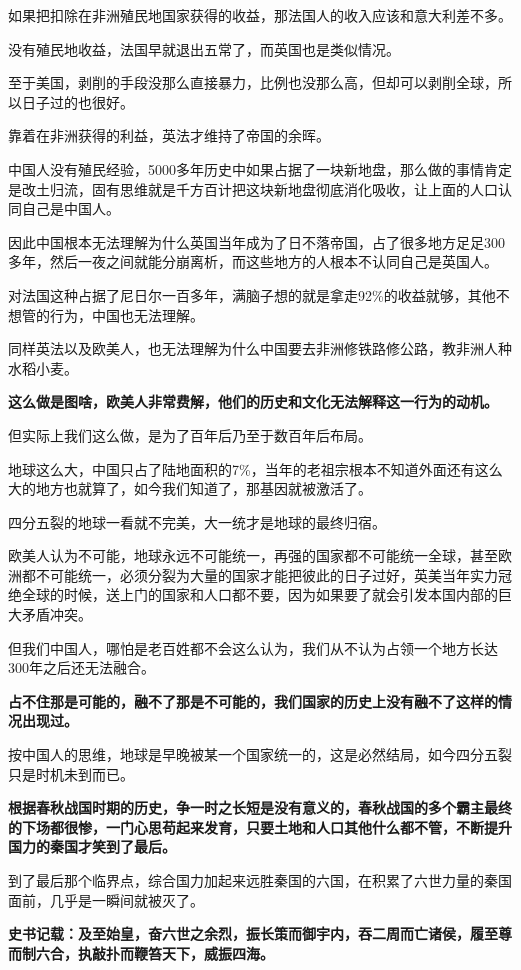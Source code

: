 \documentclass[UTF8, 11pt, oneside]{ctexart}
\newcommand{\zd}[1]{\textbf{\textcolor[RGB]{123,12,0}{#1}}} %
\begin{document}
如果把扣除在非洲殖民地国家获得的收益，那法国人的收入应该和意大利差不多。

没有殖民地收益，法国早就退出五常了，而英国也是类似情况。

至于美国，剥削的手段没那么直接暴力，比例也没那么高，但却可以剥削全球，所以日子过的也很好。

靠着在非洲获得的利益，英法才维持了帝国的余晖。

中国人没有殖民经验，5000多年历史中如果占据了一块新地盘，那么做的事情肯定是改土归流，固有思维就是千方百计把这块新地盘彻底消化吸收，让上面的人口认同自己是中国人。

因此中国根本无法理解为什么英国当年成为了日不落帝国，占了很多地方足足300多年，然后一夜之间就能分崩离析，而这些地方的人根本不认同自己是英国人。

对法国这种占据了尼日尔一百多年，满脑子想的就是拿走92\%的收益就够，其他不想管的行为，中国也无法理解。

同样英法以及欧美人，也无法理解为什么中国要去非洲修铁路修公路，教非洲人种水稻小麦。

\zd{这么做是图啥，欧美人非常费解，他们的历史和文化无法解释这一行为的动机。}

但实际上我们这么做，是为了百年后乃至于数百年后布局。

地球这么大，中国只占了陆地面积的7\%，当年的老祖宗根本不知道外面还有这么大的地方也就算了，如今我们知道了，那基因就被激活了。

四分五裂的地球一看就不完美，大一统才是地球的最终归宿。

欧美人认为不可能，地球永远不可能统一，再强的国家都不可能统一全球，甚至欧洲都不可能统一，必须分裂为大量的国家才能把彼此的日子过好，英美当年实力冠绝全球的时候，送上门的国家和人口都不要，因为如果要了就会引发本国内部的巨大矛盾冲突。

但我们中国人，哪怕是老百姓都不会这么认为，我们从不认为占领一个地方长达300年之后还无法融合。

\zd{占不住那是可能的，融不了那是不可能的，我们国家的历史上没有融不了这样的情况出现过。}

按中国人的思维，地球是早晚被某一个国家统一的，这是必然结局，如今四分五裂只是时机未到而已。

\zd{根据春秋战国时期的历史，争一时之长短是没有意义的，春秋战国的多个霸主最终的下场都很惨，一门心思苟起来发育，只要土地和人口其他什么都不管，不断提升国力的秦国才笑到了最后。}

到了最后那个临界点，综合国力加起来远胜秦国的六国，在积累了六世力量的秦国面前，几乎是一瞬间就被灭了。

\zd{史书记载：及至始皇，奋六世之余烈，振长策而御宇内，吞二周而亡诸侯，履至尊而制六合，执敲扑而鞭笞天下，威振四海。}
\end{document}
